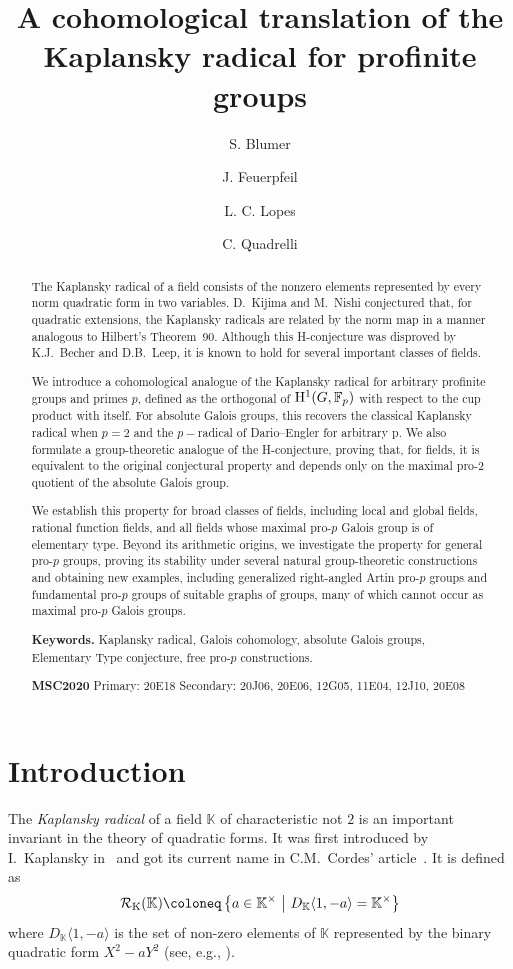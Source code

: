 \documentclass{amsart}
\title[Cohomological Kaplansky radical for profinite groups]{A cohomological translation of the Kaplansky radical for profinite groups}
\author{S. Blumer}
\author{J. Feuerpfeil}
\author{L. C. Lopes}
\author{C. Quadrelli}
\theoremstyle{definition}
\theoremstyle{remark}
\newcommand{\KK}{\mathbb{K}}
\newcommand{\calR}{\mathcal{R}}
\newcommand{\set}[2]{\left\lbrace{#1}\ \big\vert\ {#2}\right\rbrace}
\begin{document}
\begin{abstract} 
The Kaplansky radical of a field consists of the nonzero elements represented by every norm quadratic form in two variables. D.~Kijima and M.~Nishi conjectured that, for quadratic extensions, the Kaplansky radicals are related by the norm map in a manner analogous to Hilbert's Theorem~90. Although this H-conjecture was disproved by K.J.~Becher and D.B.~Leep, it is known to hold for several important classes of fields.

We introduce a cohomological analogue of the Kaplansky radical for arbitrary profinite groups and primes $p$, defined as the orthogonal of ${\rm H}^1(G,\mathbb{F}_p)$ with respect to the cup product with itself. For absolute Galois groups, this recovers the classical Kaplansky radical when $p=2$ and the $p-$radical of Dario--Engler for arbitrary p. We also formulate a group-theoretic analogue of the H-conjecture, proving that, for fields, it is equivalent to the original conjectural property and depends only on the maximal pro-$2$ quotient of the absolute Galois group.

We establish this property for broad classes of fields, including local and global fields, rational function fields, and all fields whose maximal pro-$p$ Galois group is of elementary type. Beyond its arithmetic origins, we investigate the property for general pro-$p$ groups, proving its stability under several natural group-theoretic constructions and obtaining new examples, including generalized right-angled Artin pro-$p$ groups and fundamental pro-$p$ groups of suitable graphs of groups, many of which cannot occur as maximal pro-$p$ Galois groups.

\noindent \textbf{Keywords.} Kaplansky radical, Galois cohomology, absolute Galois groups, Elementary Type conjecture, free pro-$p$ constructions.

\noindent \textbf{MSC2020} Primary: 20E18
 Secondary: 20J06, 20E06, 12G05, 11E04, 12J10, 20E08




\end{abstract}

\maketitle


\section*{Introduction}
\label{sec:intro}
The \emph{Kaplansky radical} of a field $\KK$ of characteristic not $2$ is an important invariant in the theory of quadratic forms. It was first introduced by I.~Kaplansky in~\cite{Kaplansky} and got its current name in C.M.~Cordes' article~\cite{Cordes1975}. It is defined as
\begin{align*}
    \calR_{\rm K}(\KK)\coloneq \set{a\in \KK^\times}{D_\KK\langle 1,-a\rangle=\KK^\times}
\end{align*}
where $D_\KK\langle 1,-a\rangle$ is the set of non-zero elements of $\KK$ represented by the binary quadratic form $X^2-aY^2$ (see, e.g., \cite[Chap. XII, \S 6]{Lam2005}). 
\end{document}
